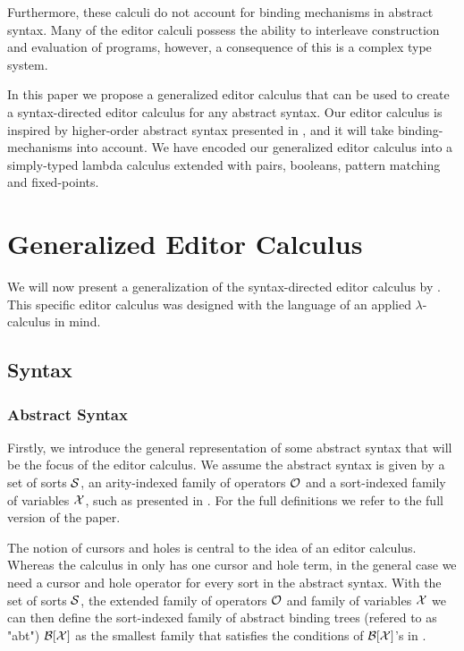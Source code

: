 \documentclass[sigplan,screen]{acmart}
\begin{document}
Furthermore, these calculi do not account for binding mechanisms in abstract syntax. Many of the editor calculi possess the ability to interleave construction and evaluation of programs, however, a consequence of this is a complex type system.

In this paper we propose a generalized editor calculus that can be used to create a syntax-directed editor calculus for any abstract syntax. 
Our editor calculus is inspired by higher-order abstract syntax presented in \cite{hoas}, and it will take binding-mechanisms into account. We have encoded our generalized editor calculus into a simply-typed lambda calculus extended with pairs, booleans, pattern matching and fixed-points.

\section{Generalized Editor Calculus}\label{sec:general_editor}
We will now present a generalization of the syntax-directed editor calculus by \cite{type_safe_structure_editor}. 
This specific editor calculus was designed with the language of an applied $\lambda$-calculus in mind. 

\subsection{Syntax}

\subsubsection{Abstract Syntax}
Firstly, we introduce the general representation of some abstract syntax that will be the focus of the editor calculus. We assume the abstract syntax is given by a set of sorts $\mathcal{S}$, an arity-indexed family of operators $\mathcal{O}$ and a sort-indexed family of variables $\mathcal{X}$, such as presented in \cite{harper_foundations}. For the full definitions we refer to the full version of the paper.

The notion of cursors and holes is central to the idea of an editor calculus. Whereas the calculus in \cite{type_safe_structure_editor} only has one cursor and hole term, in the general case we need a cursor and hole operator for every sort in the abstract syntax.
With the set of sorts $\mathcal{S}$, the extended family of operators $\mathcal{O}$ and family of variables $\mathcal{X}$ we can then define the sort-indexed family of abstract binding trees (refered to as "abt") $\mathcal{B}[\mathcal{X} ]$ as the smallest family that satisfies the conditions of $\mathcal{B}[\mathcal{X} ]$'s in \cite{harper_foundations}.
\end{document}
